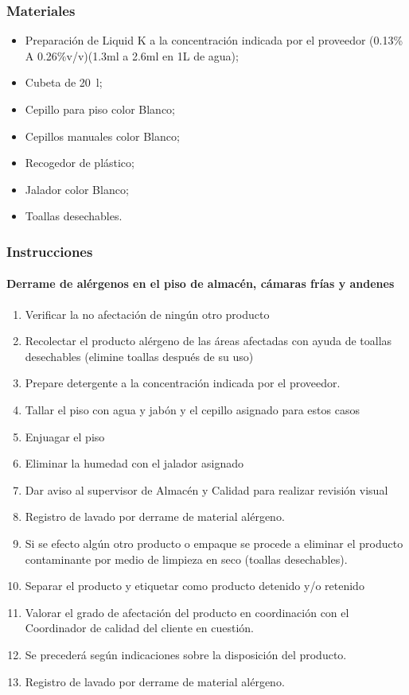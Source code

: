 \subsubsection{Materiales}

\begin{itemize}
	\item Preparación de Liquid K a la concentración indicada por el proveedor (0.13\% A 0.26\%v/v)(1.3ml a 2.6ml en 1L de agua);
	\item Cubeta de \qty{20}{\litre};
	\item Cepillo para piso color Blanco;
	\item Cepillos manuales color Blanco;
	\item Recogedor de plástico;
	\item Jalador color Blanco;
	\item Toallas desechables.
\end{itemize}

\subsubsection{Instrucciones}

\paragraph{Derrame de alérgenos en el piso de almacén, cámaras frías y andenes}

\begin{enumerate}
	\item Verificar la no afectación de ningún otro producto
	\item Recolectar el producto alérgeno de las áreas afectadas con ayuda de toallas desechables (elimine toallas después de su uso)
	\item Prepare detergente a la concentración indicada por el proveedor.
	\item Tallar el piso con agua y jabón y el cepillo asignado para estos casos
	\item Enjuagar el piso
	\item Eliminar la humedad con el jalador asignado
	\item Dar aviso al supervisor de Almacén y Calidad para realizar revisión visual
	\item Registro de lavado por derrame de material alérgeno.
	\item Si se efecto algún otro producto o empaque se procede a eliminar el producto contaminante por medio de limpieza en seco (toallas desechables).
	\item Separar el producto y etiquetar como producto detenido y/o retenido
	\item Valorar el grado de afectación del producto en coordinación con el Coordinador de calidad del cliente en cuestión.
	\item Se precederá según indicaciones sobre la disposición del producto.
	\item Registro de lavado por derrame de material alérgeno.
\end{enumerate}



